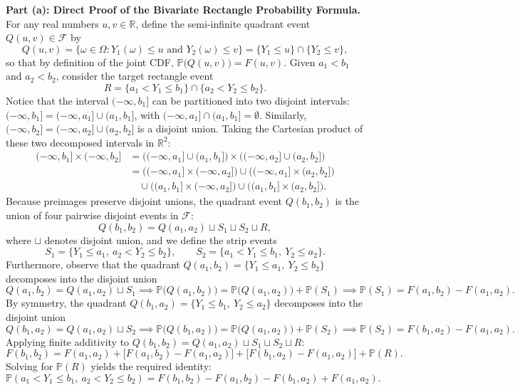 \documentclass[11pt, letterpaper]{article}
\theoremstyle{definition}
\theoremstyle{remark}
\newcommand{\R}{\mathbb{R}}
\newcommand{\Prob}{\mathbb{P}}
\newcommand{\F}{\mathcal{F}}
\begin{document}
\textbf{Part (a): Direct Proof of the Bivariate Rectangle Probability Formula.}
For any real numbers $u, v \in \R$, define the semi-infinite quadrant event $Q(u, v) \in \F$ by
\[
Q(u, v) = \{\omega \in \Omega : Y_1(\omega) \le u \text{ and } Y_2(\omega) \le v\} = \{Y_1 \le u\} \cap \{Y_2 \le v\},
\]
so that by definition of the joint CDF, $\Prob\bigl(Q(u, v)\bigr) = F(u, v)$. Given $a_1 < b_1$ and $a_2 < b_2$, consider the target rectangle event
\[
R = \{a_1 < Y_1 \le b_1\} \cap \{a_2 < Y_2 \le b_2\}.
\]
Notice that the interval $(-\infty, b_1]$ can be partitioned into two disjoint intervals: $(-\infty, b_1] = (-\infty, a_1] \cup (a_1, b_1]$, with $(-\infty, a_1] \cap (a_1, b_1] = \emptyset$. Similarly, $(-\infty, b_2] = (-\infty, a_2] \cup (a_2, b_2]$ is a disjoint union. Taking the Cartesian product of these two decomposed intervals in $\R^2$:
\begin{align*}
(-\infty, b_1] \times (-\infty, b_2] &= \bigl((-\infty, a_1] \cup (a_1, b_1]\bigr) \times \bigl((-\infty, a_2] \cup (a_2, b_2]\bigr) \\
&= \bigl((-\infty, a_1] \times (-\infty, a_2]\bigr) \cup \bigl((-\infty, a_1] \times (a_2, b_2]\bigr) \\
&\quad \cup \bigl((a_1, b_1] \times (-\infty, a_2]\bigr) \cup \bigl((a_1, b_1] \times (a_2, b_2]\bigr).
\end{align*}
Because preimages preserve disjoint unions, the quadrant event $Q(b_1, b_2)$ is the union of four pairwise disjoint events in $\F$:
\[
Q(b_1, b_2) = Q(a_1, a_2) \sqcup S_1 \sqcup S_2 \sqcup R,
\]
where $\sqcup$ denotes disjoint union, and we define the strip events
\[
S_1 = \{Y_1 \le a_1,\ a_2 < Y_2 \le b_2\}, \qquad S_2 = \{a_1 < Y_1 \le b_1,\ Y_2 \le a_2\}.
\]
Furthermore, observe that the quadrant $Q(a_1, b_2) = \{Y_1 \le a_1,\ Y_2 \le b_2\}$ decomposes into the disjoint union
\[
Q(a_1, b_2) = Q(a_1, a_2) \sqcup S_1 \implies \Prob\bigl(Q(a_1, b_2)\bigr) = \Prob\bigl(Q(a_1, a_2)\bigr) + \Prob(S_1) \implies \Prob(S_1) = F(a_1, b_2) - F(a_1, a_2).
\]
By symmetry, the quadrant $Q(b_1, a_2) = \{Y_1 \le b_1,\ Y_2 \le a_2\}$ decomposes into the disjoint union
\[
Q(b_1, a_2) = Q(a_1, a_2) \sqcup S_2 \implies \Prob\bigl(Q(b_1, a_2)\bigr) = \Prob\bigl(Q(a_1, a_2)\bigr) + \Prob(S_2) \implies \Prob(S_2) = F(b_1, a_2) - F(a_1, a_2).
\]
Applying finite additivity to $Q(b_1, b_2) = Q(a_1, a_2) \sqcup S_1 \sqcup S_2 \sqcup R$:
\[
F(b_1, b_2) = F(a_1, a_2) + \bigl[F(a_1, b_2) - F(a_1, a_2)\bigr] + \bigl[F(b_1, a_2) - F(a_1, a_2)\bigr] + \Prob(R).
\]
Solving for $\Prob(R)$ yields the required identity:
\[
\Prob(a_1 < Y_1 \le b_1,\ a_2 < Y_2 \le b_2) = F(b_1, b_2) - F(a_1, b_2) - F(b_1, a_2) + F(a_1, a_2).
\]
\end{document}

